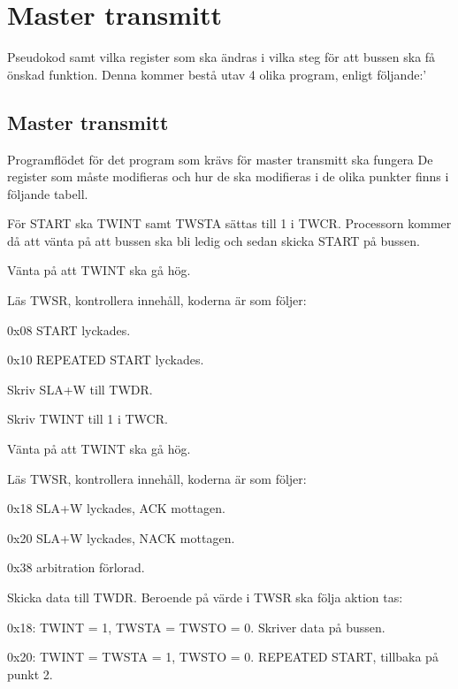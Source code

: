 
\section{Master transmitt}
\label{bussbilaga}
Pseudokod samt vilka register som ska ändras i vilka steg för att bussen ska få önskad funktion. Denna kommer bestå utav 4 olika program, enligt följande:’

\subsection{Master transmitt}
Programflödet för det program som krävs för master transmitt ska fungera De register som måste modifieras och hur de ska modifieras i de olika punkter finns i följande tabell.

\begin{packed_enumerate}
\item För START ska TWINT samt TWSTA sättas till 1 i TWCR. Processorn kommer då att vänta på att bussen ska bli ledig och sedan skicka START på bussen.
\item Vänta på att TWINT ska gå hög.
\item Läs TWSR, kontrollera innehåll, koderna är som följer:
\begin{packed_enumerate}
\item 0x08 START lyckades.
\item 0x10 REPEATED START lyckades.
\end{packed_enumerate}
\item Skriv SLA+W till TWDR.
\item Skriv TWINT till 1 i TWCR.
\item Vänta på att TWINT ska gå hög.
\item Läs TWSR, kontrollera innehåll, koderna är som följer:
\begin{packed_enumerate}
\item 0x18 SLA+W lyckades, ACK mottagen.
\item 0x20 SLA+W lyckades, NACK mottagen.
\item 0x38 arbitration förlorad.
\end{packed_enumerate}
\item Skicka data till TWDR. Beroende på värde i TWSR ska följa aktion tas:
\begin{packed_enumerate}
\item 0x18: TWINT = 1, TWSTA = TWSTO = 0. Skriver data på bussen.
\item 0x20: TWINT = TWSTA = 1, TWSTO = 0. REPEATED START, tillbaka på punkt 2.

\end{packed_enumerate}
\end{packed_enumerate}
